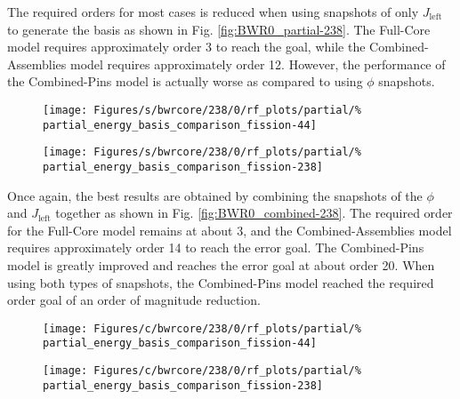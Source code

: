 The required orders for most cases is reduced when using snapshots of only 
$J_{\text{left}}$ to generate the basis as shown in Fig. 
\ref{fig:BWR0_partial-238}.  The Full-Core model requires approximately order 3 
to reach the goal, while the Combined-Assemblies model requires approximately 
order 12.  However, the performance of the Combined-Pins model is actually 
worse 
as compared to using $\phi$ snapshots.

\begin{figure*}[tb]
    \centering
    \begin{subfigure}{0.5\textwidth}
        \centering
    \texttt{[image: Figures/s/bwrcore/238/0/rf\_plots/partial/\%
        partial\_energy\_basis\_comparison\_fission-44]}
    \end{subfigure}%
    \begin{subfigure}{0.5\textwidth}
        \centering
    \texttt{[image: Figures/s/bwrcore/238/0/rf\_plots/partial/\%
        partial\_energy\_basis\_comparison\_fission-238]}
    \end{subfigure}
    \caption{Relative error for 238-group, BWR-Core 0 test problem using 
        snapshots of only $J_{\text{left}}$}
    \label{fig:BWR0_partial-238}
\end{figure*}

Once again, the best results are obtained by combining the snapshots of the 
$\phi$ and $J_{\text{left}}$ together as shown in Fig. 
\ref{fig:BWR0_combined-238}.  The required order for the Full-Core model 
remains at about 3, and the Combined-Assemblies model requires approximately 
order 14 to reach the error goal.  The Combined-Pins model is greatly improved 
and reaches the error goal at about order 20.  When using both types of 
snapshots, the Combined-Pins model reached the required order goal of an order 
of magnitude reduction.

\begin{figure*}[tb]
    \centering
    \begin{subfigure}{0.5\textwidth}
        \centering
    \texttt{[image: Figures/c/bwrcore/238/0/rf\_plots/partial/\%
        partial\_energy\_basis\_comparison\_fission-44]}
    \end{subfigure}%
    \begin{subfigure}{0.5\textwidth}
        \centering
    \texttt{[image: Figures/c/bwrcore/238/0/rf\_plots/partial/\%
        partial\_energy\_basis\_comparison\_fission-238]}
    \end{subfigure}
    \caption{Relative error for 238-group, BWR-Core 0 test problem using 
        snapshots of both $\phi$ and $J_{\text{left}}$}
    \label{fig:BWR0_combined-238}
\end{figure*}

